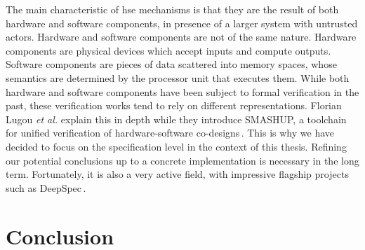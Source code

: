 The main characteristic of \ac{hse} mechanisms is that they are the result of
both hardware and software components, in presence of a larger system with
untrusted actors.
%
Hardware and software components are not of the same nature.
%
Hardware components are physical devices which accept inputs and compute
outputs.
%
Software components are pieces of data scattered into memory spaces, whose
semantics are determined by the processor unit that executes them.
%
While both hardware and software components have been subject to formal
verification in the past, these verification works tend to rely on different
representations.
%
Florian Lugou \emph{et al.} explain this in depth while they introduce SMASHUP,
a toolchain for unified verification of hardware-software
co-designs\,\cite{lugou2017smashup}.
%
This is why we have decided to focus on the specification level in the context
of this thesis.
%
Refining our potential conclusions up to a concrete implementation is necessary
in the long term.
%
Fortunately, it is also a very active field, with impressive flagship projects
such as DeepSpec\,\cite{appel2017deepspec}.

\section{Conclusion}
